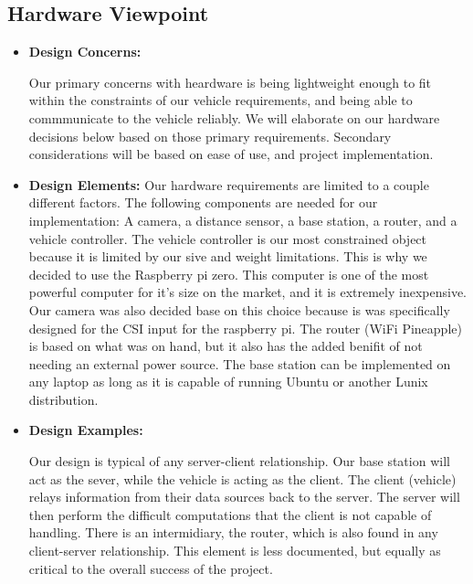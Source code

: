 \documentclass[onecolumn, draftclsnofoot,10pt, compsoc]{IEEEtran}
\begin{document}
\subsection{Hardware Viewpoint} 
\begin{itemize}
\item{ \textbf{Design Concerns:}}

Our primary concerns with heardware is being lightweight enough to fit within the constraints of our vehicle requirements, and being able to commmunicate to the vehicle reliably. We will elaborate on our hardware decisions below based on those primary requirements. Secondary considerations will be based on ease of use, and project implementation. 

\item{ \textbf{Design Elements:}}
Our hardware requirements are limited to a couple different factors. The following components are needed for our implementation: A camera, a distance sensor, a base station, a router, and a vehicle controller. The vehicle controller is our most constrained object because it is limited by our sive and weight limitations. This is why we decided to use the Raspberry pi zero. This computer is one of the most powerful computer for it's size on the market, and it is extremely inexpensive. Our camera was also decided base on this choice because is was specifically designed for the CSI input for the raspberry pi. The router (WiFi Pineapple) is based on what was on hand, but it also has the added benifit of not needing an external power source. The base station can be implemented on any laptop as long as it is capable of running Ubuntu or another Lunix distribution.  

\item{ \textbf{Design Examples:}} %

Our design is typical of any server-client relationship. Our base station will act as the sever, while the vehicle is acting as the client. The client (vehicle) relays information from their data sources back to the server. The server will then perform the difficult computations that the client is not capable of handling. There is an intermidiary, the router, which is also found in any client-server relationship. This element is less documented, but equally as critical to the overall success of the project.
\end{itemize}
\end{document}
